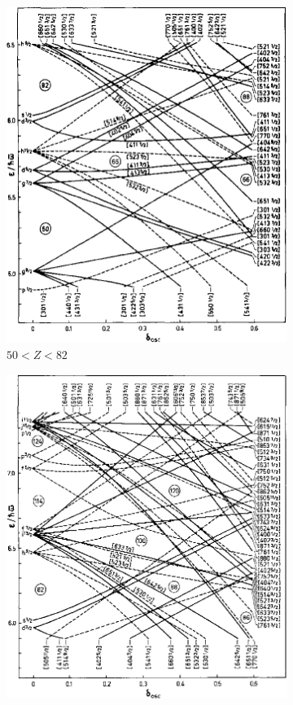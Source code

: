 \documentclass[8pt,a4paper, twoside]{report}
\begin{document}
\begin{figure}
\centering
\begin{subfigure}[b]{0.45\textwidth}
    \includegraphics[width=\textwidth]{./figures/Nilsson/proton_deformed50.png}
    \caption{$50<Z<82$}
\end{subfigure}	
\quad
\begin{subfigure}[b]{0.45\textwidth}
    \includegraphics[width=\textwidth]{./figures/Nilsson/proton_deformed82.png}

\end{subfigure}
\end{figure}
\end{document}
